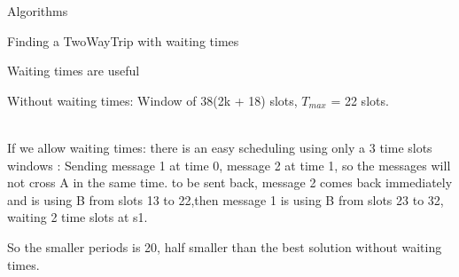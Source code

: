 \documentclass[a4paper,10pt]{report}
\begin{document}
\begin{chapter}{Algorithms}
\begin{section}{Finding a TwoWayTrip with waiting times}
\begin{subsection}{Waiting times are useful}
{{{
  } 
  Without waiting times: Window of 38(2k + 18) slots, $T_{max}$ = 22 slots.
  }}\\
 


If we allow waiting times: there is an easy scheduling using only a 3 time slots windows : 
Sending message 1 at time 0, message 2 at time 1, so the messages will not cross A in the same time. to be sent back,
message 2 comes back immediately and is using B from slots 13 to 22,then message 1 is using B from slots 23 to 32, waiting 2 time slots at s1.

So the smaller periods is 20, half smaller than the best solution without waiting times.\\

\end{subsection}
\end{section}
\end{chapter}
\end{document}

